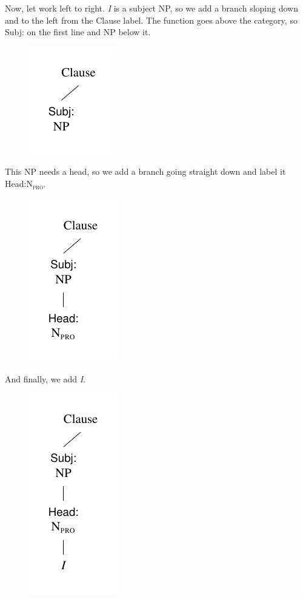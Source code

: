Now, let work left to right. \textit{I} is a subject NP, so we add a branch sloping down and to the left from the Clause label. The function goes above the category, so Subj: on the first line and NP below it.

\begin{figure}[H]
    \centering
    \includegraphics{figures/ihadmybreakfast.pdf}
    \label{fig:breakfast1}
\end{figure}

This NP needs a head, so we add a branch going straight down and label it Head:N\textsubscript{\textsc{pro}}.

\begin{figure}[H]
    \centering
    \includegraphics{figures/ihadmybreakfast2.pdf}
    \label{fig:breakfast2}
\end{figure}

And finally, we add \textit{I}.

\begin{figure}[H]
    \centering
    \includegraphics{figures/ihadmybreakfast3.pdf}
    \label{fig:breakfast3}
\end{figure}

